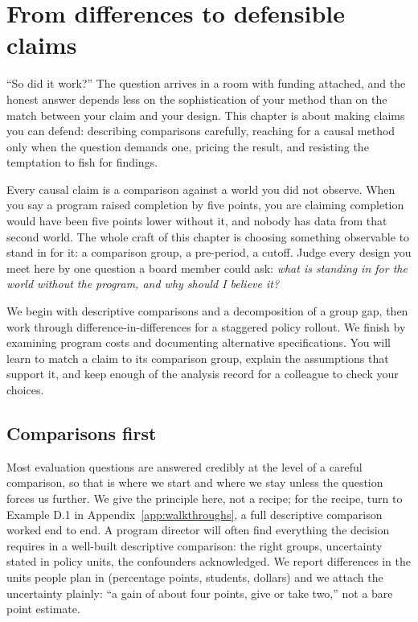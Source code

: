 \documentclass[
    a4paper,
    fontsize=10pt,
    twoside=true,
    numbers=noenddot,
]{kaobook}
\begin{document}
\chapter{From differences to defensible claims}\label{ch:claims}

\enquote{So did it work?} The question arrives in a room with funding attached, and the honest answer depends less on the sophistication of your method than on the match between your claim and your design. This chapter is about making claims you can defend: describing comparisons carefully, reaching for a causal method only when the question demands one, pricing the result, and resisting the temptation to fish for findings.

Every causal claim is a comparison against a world you did not observe. When you say a program raised completion by five points, you are claiming completion would have been five points lower without it, and nobody has data from that second world. The whole craft of this chapter is choosing something observable to stand in for it: a comparison group, a pre-period, a cutoff. Judge every design you meet here by one question a board member could ask: \emph{what is standing in for the world without the program, and why should I believe it?}

We begin with descriptive comparisons and a decomposition of a group gap, then work through difference-in-differences for a staggered policy rollout. We finish by examining program costs and documenting alternative specifications. You will learn to match a claim to its comparison group, explain the assumptions that support it, and keep enough of the analysis record for a colleague to check your choices.

\section{Comparisons first}\label{sec:comparisons}
Most evaluation questions are answered credibly at the level of a careful comparison, so that is where we start and where we stay unless the question forces us further. We give the principle here, not a recipe; for the recipe, turn to Example D.1 in Appendix~\ref{app:walkthroughs}, a full descriptive comparison worked end to end. A program director will often find everything the decision requires in a well-built descriptive comparison: the right groups, uncertainty stated in policy units, the confounders acknowledged. We report differences in the units people plan in (percentage points, students, dollars) and we attach the uncertainty plainly: \enquote{a gain of about four points, give or take two,} not a bare point estimate.
\end{document}
